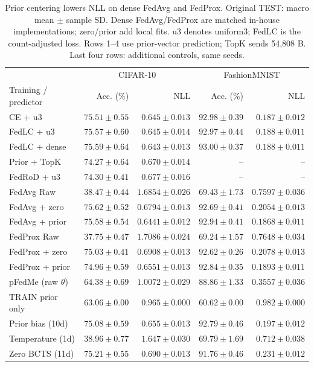 \begin{table}[!htb]\centering\small\setlength{\tabcolsep}{2.8pt}
\caption{Prior centering lowers NLL on dense FedAvg and FedProx. Original TEST: macro mean $\pm$ sample SD. Dense FedAvg/FedProx are matched in-house implementations; zero/prior add local fits. u3 denotes uniform3; FedLC is the count-adjusted loss. Rows 1--4 use prior-vector prediction; TopK sends 54,808 B. Last four rows: additional controls, same seeds.}\label{tab:training}\label{tab:reference}\label{tab:dense_baselines}\label{tab:full}
\begin{tabular}{lrrrr}\toprule
& \multicolumn{2}{c}{CIFAR-10} & \multicolumn{2}{c}{FashionMNIST}\\
Training / predictor & Acc. (\%) & NLL & Acc. (\%) & NLL\\\midrule
CE + u3 & $75.51\pm0.55$ & $0.645\pm0.013$ & $92.98\pm0.39$ & $0.187\pm0.012$\\
FedLC + u3 & $75.57\pm0.60$ & $0.645\pm0.014$ & $92.97\pm0.44$ & $0.188\pm0.011$\\
FedLC + dense & $75.59\pm0.64$ & $0.643\pm0.013$ & $93.00\pm0.37$ & $0.188\pm0.011$\\\midrule
Prior + TopK & $74.27\pm0.64$ & $0.670\pm0.014$ & -- & --\\
FedRoD + u3 & $74.30\pm0.41$ & $0.677\pm0.016$ & -- & --\\\midrule
FedAvg Raw & $38.47 \pm 0.44$ & $1.6854 \pm 0.026$ & $69.43 \pm 1.73$ & $0.7597 \pm 0.036$\\
FedAvg + zero & $75.62 \pm 0.52$ & $0.6794 \pm 0.013$ & $92.69 \pm 0.41$ & $0.2054 \pm 0.013$\\
FedAvg + prior & $75.58 \pm 0.54$ & $0.6441 \pm 0.012$ & $92.94 \pm 0.41$ & $0.1868 \pm 0.011$\\
FedProx Raw & $37.75 \pm 0.47$ & $1.7086 \pm 0.024$ & $69.24 \pm 1.57$ & $0.7648 \pm 0.034$\\
FedProx + zero & $75.03 \pm 0.41$ & $0.6908 \pm 0.013$ & $92.62 \pm 0.26$ & $0.2078 \pm 0.013$\\
FedProx + prior & $74.96 \pm 0.59$ & $0.6551 \pm 0.013$ & $92.84 \pm 0.35$ & $0.1893 \pm 0.011$\\
\midrule
pFedMe (raw $\theta$) & $64.38\pm0.69$ & $1.0072\pm0.029$ & $88.86\pm1.33$ & $0.3557\pm0.036$\\
\midrule
TRAIN prior only & $63.06\pm0.00$ & $0.965\pm0.000$ & $60.62\pm0.00$ & $0.982\pm0.000$\\
Prior bias (10d) & $75.08\pm0.59$ & $0.655\pm0.013$ & $92.79\pm0.46$ & $0.197\pm0.012$\\
Temperature (1d) & $38.96\pm0.77$ & $1.647\pm0.030$ & $69.79\pm1.69$ & $0.712\pm0.038$\\
Zero BCTS (11d) & $75.21\pm0.55$ & $0.690\pm0.013$ & $91.76\pm0.46$ & $0.231\pm0.012$\\
\bottomrule
\end{tabular}
\end{table}
